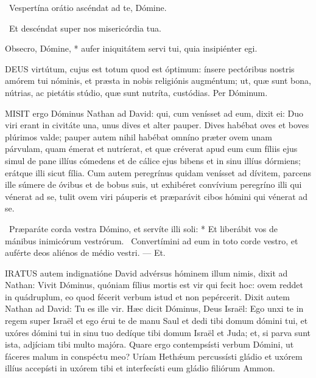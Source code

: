 
\V\ Vespertína orátio ascéndat ad te, Dómine.

\R\ Et descéndat super nos misericórdia tua.

 Obsecro, Dómine, * aufer iniquitátem servi tui, quia insipiénter egi.


\lettrine[lines=2]{D}{EUS} virtútum, cujus est totum quod est óptimum: ínsere pectóribus nostris amórem tui nóminis, et præsta in nobis religiónis augméntum; ut, quæ sunt bona, nútrias, ac pietátis stúdio, quæ sunt nutríta, custódias. Per Dóminum.






\lettrine[lines=2]{M}{ISIT} ergo Dóminus Nathan ad David: qui, cum venísset ad eum, dixit ei: Duo viri erant in civitáte una, unus dives et alter pauper. Dives habébat oves et boves plúrimos valde; pauper autem nihil habébat omníno præter ovem unam párvulam, quam émerat et nutríerat, et quæ créverat apud eum cum fíliis ejus simul de pane illíus cómedens et de cálice ejus bibens et in sinu illíus dórmiens; erátque illi sicut fília. Cum autem peregrínus quidam venísset ad dívitem, parcens ille súmere de óvibus et de bobus suis, ut exhibéret convívium peregríno illi qui vénerat ad se, tulit ovem viri páuperis et præparávit cibos hómini qui vénerat ad se.

\R\ Præparáte corda vestra Dómino, et servíte illi soli: * Et liberábit vos de mánibus inimicórum vestrórum. \V\ Convertímini ad eum in toto corde vestro, et auférte deos aliénos de médio vestri. --- Et.


\lettrine[lines=2]{I}{RATUS} autem indignatióne David advérsus hóminem illum nimis, dixit ad Nathan: Vivit Dóminus, quóniam fílius mortis est vir qui fecit hoc: ovem reddet in quádruplum, eo quod fécerit verbum istud et non pepércerit. Dixit autem Nathan ad David: Tu es ille vir. Hæc dicit Dóminus, Deus Israël: Ego unxi te in regem super Israël et ego érui te de manu Saul et dedi tibi domum dómini tui, et uxóres dómini tui in sinu tuo dedíque tibi domum Israël et Juda; et, si parva sunt ista, adjíciam tibi multo majóra. Quare ergo contempsísti verbum Dómini, ut fáceres malum in conspéctu meo? Uríam Hethǽum percussísti gládio et uxórem illíus accepísti in uxórem tibi et interfecísti eum gládio filiórum Ammon.

